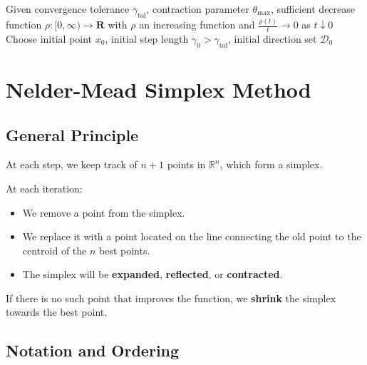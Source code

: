 \begin{algorithm}[H]
\caption{Pattern search method}
\label{alg:pattern-search}
Given convergence tolerance $\gamma_{\text{tol}}$, contraction parameter $\theta_{\max}$, sufficient decrease function $\rho : [0,\infty) \to \mathbf{R}$ with $\rho$ an increasing function and $\frac{\rho(t)}{t} \to 0$ as $t \downarrow 0$\;
Choose initial point $x_0$, initial step length $\gamma_0 > \gamma_{\text{tol}}$, initial direction set $\mathcal{D}_0$\;
\end{algorithm}

\section{Nelder-Mead Simplex Method}

\subsection{General Principle}

At each step, we keep track of $n+1$ points in $\mathbb{R}^n$, which form a simplex.

At each iteration:
\begin{itemize}
    \item We remove a point from the simplex.
    \item We replace it with a point located on the line connecting the old point to the centroid of the $n$ best points.
    \item The simplex will be \textbf{expanded}, \textbf{reflected}, or \textbf{contracted}.
\end{itemize}

If there is no such point that improves the function, we \textbf{shrink} the simplex towards the best point.

\subsection{Notation and Ordering}

